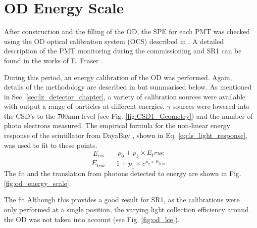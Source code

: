 \section{OD Energy Scale} \label{sec:od_energy_scale}
\par
After construction and the filling of the OD, the SPE for each PMT was checked using the OD optical calibration system (OCS) described in \cite{lz_ocs_system_ref}.
A detailed description of the PMT monitoring during the commissioning and SR1 can be found in the works of E. Fraser \cite{ewanfraser_thesis_ref}. 
\par
During this period, an energy calibration of the OD was performed.
Again, details of the methodology are described in \cite{ewanfraser_thesis_ref} but summarised below.
As mentioned in Sec. \ref{sec:lz_detector_chapter}, a variety of calibration sources were available with output a range of particles at different energies.
$\gamma$ sources were lowered into the CSD's to the 700mm level (see Fig. \ref{fig:CSD1_Geometry}) and the number of photo electrons measured.
The empirical formula for the non-linear energy response of the scintillator from DayaBay \cite{dayabay_antineutrino_oscillation_ref, ls_nonlinear_energy_response_ref}, shown in Eq. \ref{eq:ls_light_response}, was used to fit to these points.
\begin{equation}
    \frac{E_{vis}}{E_{true}} = \frac{p_0  + p_3 \times E_true}{1 + p_1 \times e^{p_2 \times E_{true}}}
    \label{eq:ls_light_response}
\end{equation}
The fit and the translation from photons detected to energy are shown in Fig. \ref{fig:od_energy_scale}.



\par
The fit 
Although this provides a good result for SR1, as the calibrations were only performed at a single position, the varying light collection efficiency around the OD was not taken into account (see Fig. \ref{fig:od_lce}).

